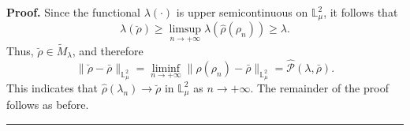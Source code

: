 \documentclass[12pt,thmsa]{article}
\newenvironment{proof}[1][Proof]{\noindent\textbf{#1.} }{\ \rule{0.5em}{0.5em}}
\begin{document}
\begin{proof}
Since the functional $\lambda(\cdot)$ is upper semicontinuous on $\mathbb{L}%
_{\mu}^{2}$, it follows that
\begin{equation*}
\lambda(\breve{\rho})\geq \limsup_{n\to+\infty}\lambda(\hat{\rho}%
(\rho_n))\geq \lambda.
\end{equation*}
Thus, $\breve{\rho} \in \tilde{M}_{\lambda}$, and therefore
\begin{equation*}
\|\breve{\rho} -\bar{\rho}\|_{\mathbb{L}^2_{\mu }}= \liminf_{n\to +\infty}\|%
\hat{\rho}(\rho_n)-\bar{\rho}\|_{\mathbb{L}^2_{\mu }}= \hat{\mathcal{P}}%
(\lambda,\bar{\rho}).
\end{equation*}
This indicates that $\hat{\rho}(\lambda_n) \to \breve{\rho}$ in $\mathbb{L}%
^2_{\mu}$ as $n \to +\infty$. The remainder of the proof follows as before.
\end{proof}
\end{document}
